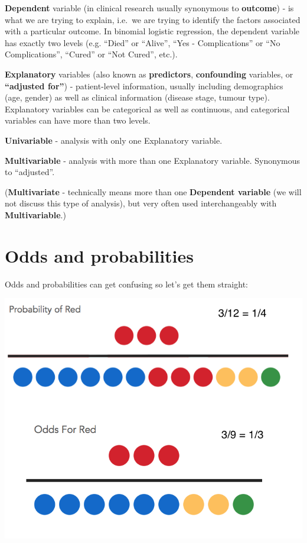 \documentclass[12pt,]{krantz}
\theoremstyle{definition}
\theoremstyle{definition}
\theoremstyle{definition}
\theoremstyle{remark}
\begin{document}
\textbf{Dependent} variable (in clinical research usually synonymous to
\textbf{outcome}) - is what we are trying to explain, i.e.~we are trying
to identify the factors associated with a particular outcome. In
binomial logistic regression, the dependent variable has exactly two
levels (e.g. ``Died'' or ``Alive'', ``Yes - Complications'' or ``No
Complications'', ``Cured'' or ``Not Cured'', etc.).

\textbf{Explanatory} variables (also known as \textbf{predictors},
\textbf{confounding} variables, or \textbf{``adjusted for''}) -
patient-level information, usually including demographics (age, gender)
as well as clinical information (disease stage, tumour type).
Explanatory variables can be categorical as well as continuous, and
categorical variables can have more than two levels.

\textbf{Univariable} - analysis with only one Explanatory variable.

\textbf{Multivariable} - analysis with more than one Explanatory
variable. Synonymous to ``adjusted''.

(\textbf{Multivariate} - technically means more than one
\textbf{Dependent variable} (we will not discuss this type of analysis),
but very often used interchangeably with \textbf{Multivariable}.)

\hypertarget{odds-and-probabilities}{%
\section{Odds and probabilities}\label{odds-and-probabilities}}

Odds and probabilities can get confusing so let's get them straight:

\includegraphics{images/p_vs_odds2.png}
\end{document}
